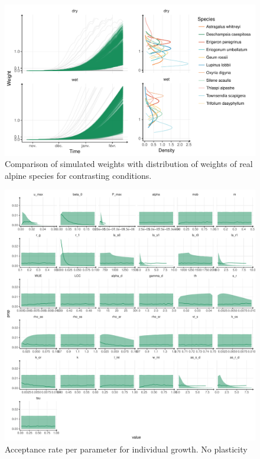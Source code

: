 \begin{figure}\label{fig:comparison_BM}
\includegraphics[width = \textwidth]{./2_PP/Figures/weight_full_sim.pdf}
\caption{Comparison of simulated weights with distribution of weights of real alpine species for contrasting conditions.}
\end{figure}


\begin{figure}\label{fig:accept_rate}
\includegraphics[width = \textwidth]{./2_PP/Figures/acceptance_rate_RSRnWeight_per_par.pdf}
\caption{Acceptance rate per parameter for individual growth. No plasticity}
\end{figure}

